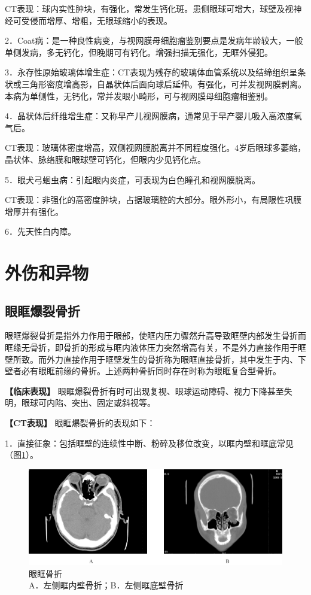 CT表现：球内实性肿块，有强化，常发生钙化斑。患侧眼球可增大，球壁及视神经可受侵而增厚、增粗，无眼球缩小的表现。

2．Coat病：是一种良性病变，与视网膜母细胞瘤鉴别要点是发病年龄较大，一般单侧发病，多无钙化，但晚期可有钙化。增强扫描无强化，无眶外侵犯。

3．永存性原始玻璃体增生症：CT表现为残存的玻璃体血管系统以及结缔组织呈条状或三角形密度增高影，自晶状体后面向球后延伸。有强化，可并发视网膜剥离。本病为单侧性，无钙化，常并发眼小畸形，可与视网膜母细胞瘤相鉴别。

4．晶状体后纤维增生症：又称早产儿视网膜病，通常见于早产婴儿吸入高浓度氧气后。

CT表现：玻璃体密度增高，双侧视网膜脱离并不同程度强化。4岁后眼球多萎缩，晶状体、脉络膜和眼球壁可钙化，但眼内少见钙化点。

5．眼犬弓蛔虫病：引起眼内炎症，可表现为白色瞳孔和视网膜脱离。

CT表现：非强化的高密度肿块，占据玻璃腔的大部分。眼外形小，有局限性巩膜增厚并有强化。

6．先天性白内障。

\section{外伤和异物}

\subsection{眼眶爆裂骨折}

眼眶爆裂骨折是指外力作用于眼部，使眶内压力骤然升高导致眶壁内部发生骨折而眶缘无骨折，即骨折的形成与眶内液体压力突然增高有关，不是外力直接作用于眶壁所致。而外力直接作用于眶壁发生的骨折称为眼眶直接骨折，其中发生于内、下壁者必有眼眶前缘的骨折。上述两种骨折同时存在时称为眼眶复合型骨折。

\textbf{【临床表现】}
眼眶爆裂骨折有时可出现复视、眼球运动障碍、视力下降甚至失明，眼球可内陷、突出、固定或斜视等。

\textbf{【CT表现】} 眼眶爆裂骨折的表现如下：

1．直接征象：包括眶壁的连续性中断、粉碎及移位改变，以眶内壁和眶底常见（图\ref{fig3-2}）。

\begin{figure}[!htbp]
 \centering
 \includegraphics[width=.7\textwidth,height=\textheight,keepaspectratio]{./images/Image00097.jpg}
 \captionsetup{justification=centering}
 \caption{眼眶骨折\\{\small A．左侧眶内壁骨折；B．左侧眶底壁骨折}}
 \label{fig3-2}
  \end{figure} 

